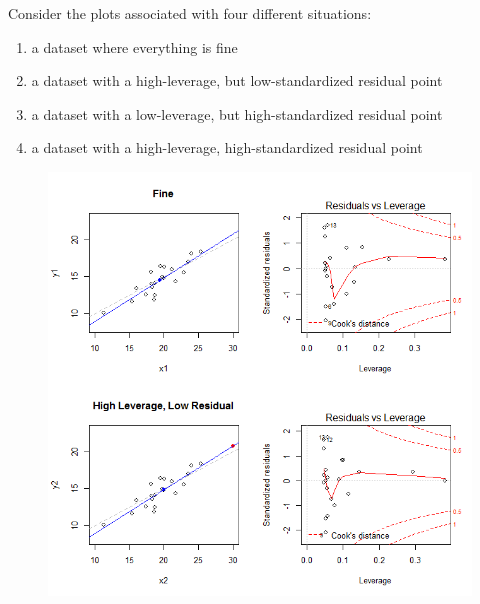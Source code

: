 \documentclass[residuals.tex]{subfiles}
\begin{document}
Consider the plots associated with four different situations:
\begin{enumerate}
	\item a dataset where everything is fine
	\item a dataset with a high-leverage, but low-standardized residual point
	\item a dataset with a low-leverage, but high-standardized residual point
	\item a dataset with a high-leverage, high-standardized residual point
\end{enumerate}
\newpage
\begin{figure}[h!]
	\centering
	\includegraphics[width=1.0\linewidth]{plots2}
	\caption{}
	\label{fig:plots2}
\end{figure}
\newpage
\end{document}
